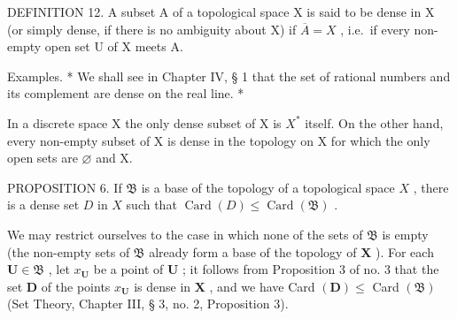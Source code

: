 DEFINITION 12. A subset A of a topological space X is said to be dense in X (or simply dense, if there is no ambiguity about X) if \(\overline{A} = X\) , i.e.~if every non-empty open set U of X meets A.

Examples. * We shall see in Chapter IV, § 1 that the set of rational numbers and its complement are dense on the real line. *

In a discrete space X the only dense subset of X is \(X^{*}\) itself. On the other hand, every non-empty subset of X is dense in the topology on X for which the only open sets are \(\varnothing\) and X.

PROPOSITION 6. If \(\mathfrak{B}\) is a base of the topology of a topological space \(X\) , there is a dense set \(D\) in \(X\) such that \(\operatorname{Card}(D) \leqslant \operatorname{Card}(\mathfrak{B})\) .

We may restrict ourselves to the case in which none of the sets of \(\mathfrak{B}\) is empty (the non-empty sets of \(\mathfrak{B}\) already form a base of the topology of \(\mathbf{X}\) ). For each \(\mathbf{U} \in \mathfrak{B}\) , let \(x_{\mathbf{U}}\) be a point of \(\mathbf{U}\) ; it follows from Proposition 3 of no. 3 that the set \(\mathbf{D}\) of the points \(x_{\mathbf{U}}\) is dense in \(\mathbf{X}\) , and we have Card \((\mathbf{D}) \leqslant\) Card \((\mathfrak{B})\) (Set Theory, Chapter III, § 3, no. 2, Proposition 3).

